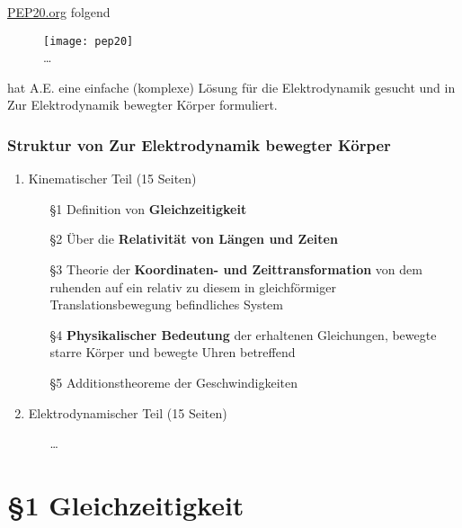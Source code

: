 \documentclass[]{beamer}%
\begin{document}
\begin{frame}
    \href{https://pep20.org/}{PEP20.org} folgend 
    \begin{figure}[h]
            \centering
            \texttt{[image: pep20]}\\
            \dots
    \end{figure}
    hat A.E. eine einfache (komplexe) 
    Lösung für die Elektrodynamik gesucht und in
    \glqq Zur Elektrodynamik bewegter Körper\grqq{} formuliert.
\end{frame}

\begin{frame}
    \frametitle{Struktur von \glqq{} Zur Elektrodynamik bewegter Körper \grqq{}}
    \begin{enumerate}[I]
        \item Kinematischer Teil (15 Seiten)
        \begin{itemize}
			\item[§1]   Definition von \textbf{Gleichzeitigkeit}
			\item[§2]   Über die \textbf{Relativität von Längen und Zeiten}
			\item[§3]   Theorie der \textbf{Koordinaten- und Zeittransformation} von dem ruhenden
                        auf ein relativ zu diesem in gleichförmiger Translationsbewegung 
                        befindliches System
			\item[§4]   \textbf{Physikalischer Bedeutung} der erhaltenen Gleichungen, 
                        bewegte starre Körper und bewegte Uhren betreffend
			\item[§5]   Additionstheoreme der Geschwindigkeiten
		\end{itemize}
        \vspace{10pt}
		\item Elektrodynamischer Teil (15 Seiten)
        \begin{itemize}
            \item[]\dots
        \end{itemize}
	\end{enumerate}
\end{frame}
\section{§1 Gleichzeitigkeit}

\begin{frame}
\end{frame}
\end{document}
